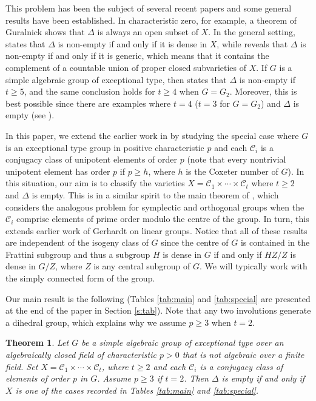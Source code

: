 \documentclass[twoside,a4paper,reqno,11pt]{amsart}
\newcommand{\<}{\langle}
\renewcommand{\>}{\rangle}
\newcommand{\geqs}{\geqslant}
\renewcommand{\:}{\colon}
\theoremstyle{plain}
\newtheorem{theorem}{Theorem}
\theoremstyle{definition}
\begin{document}
This problem has been the subject of several recent papers and some general results have been established. In characteristic zero, for example, a theorem of Guralnick \cite{gurnato} shows that $\Delta$ is always an open subset of $X$. In the general setting, \cite[Theorem 2]{BGG1} states that $\Delta$ is non-empty if and only if it is dense in $X$, while \cite[Theorem 1]{BGG2} reveals that $\Delta$ is non-empty if and only if it is generic, which means that it contains the complement of a countable union of proper closed subvarieties of $X$. If $G$ is a simple algebraic group of exceptional type, then \cite[Theorem 7]{BGG1} states that $\Delta$ is non-empty if $t \geqs 5$, and the same conclusion holds for $t \geqs 4$ when $G = G_2$. Moreover, this is best possible since there are examples where $t=4$ ($t=3$ for $G=G_2$) and $\Delta$ is empty (see \cite[Theorem 3.22]{BGG1}). 

In this paper, we extend the earlier work in \cite{BGG1} by studying the special case where $G$ is an exceptional type group in positive characteristic $p$ and each $\mathcal{C}_i$ is a conjugacy class of unipotent elements of order $p$ (note that every nontrivial unipotent element has order $p$ if $p \geqs h$, where $h$ is the Coxeter number of $G$). In this situation, our aim is to classify the varieties $X = \mathcal{C}_1 \times \cdots \times \mathcal{C}_t$ where $t \geqs 2$ and $\Delta$ is empty. This is in a similar spirit to the main theorem of \cite{BGG2}, which considers the analogous problem for symplectic and orthogonal groups when the $\mathcal{C}_i$ comprise elements of prime order modulo the centre of the group. In turn, this extends earlier work of Gerhardt \cite{Ger} on linear groups. Notice that all of these results are independent of the isogeny class of $G$ since the centre of $G$ is contained in the Frattini subgroup and thus a subgroup $H$ is dense in $G$ if and only if $HZ/Z$ is dense in $G/Z$, where $Z$ is any central subgroup of $G$. We will typically work with the simply connected form of the group.

Our main result is the following (Tables \ref{tab:main} and \ref{tab:special} are presented at the end of the paper in Section \ref{s:tab}). Note that any two involutions generate a dihedral group, which explains why we assume $p \geqs 3$ when $t=2$.

\begin{theorem}\label{t:main}
Let $G$ be a simple algebraic group of exceptional type over an algebraically closed field of characteristic $p>0$ that is not algebraic over a finite field. Set $X = \mathcal{C}_1 \times \cdots \times \mathcal{C}_t$, where $t \geqs 2$ and each $\mathcal{C}_i$ is a conjugacy class of elements of order $p$ in $G$. Assume $p \geqs 3$ if $t=2$. Then $\Delta$ is empty if and only if 
$X$ is one of the cases recorded in Tables \ref{tab:main} and \ref{tab:special}.
\end{theorem}
\end{document}
